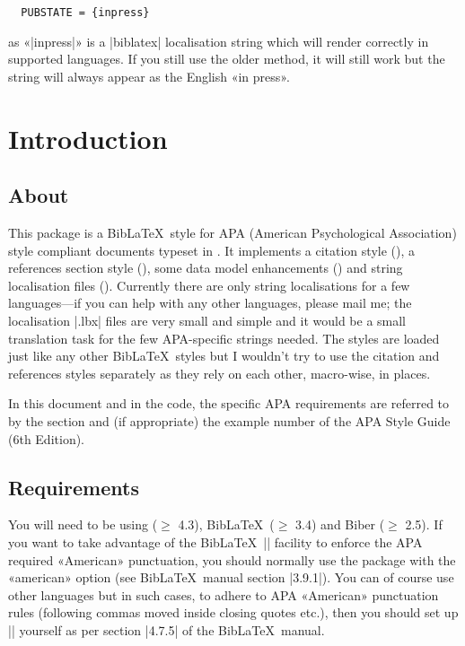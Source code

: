 \documentclass{ltxdockit}
\begin{document}
\begin{verbatim}
  PUBSTATE = {inpress}
\end{verbatim}

\noindent as «|inpress|» is a |biblatex| localisation string which will
render correctly in supported languages. If you still use the older method,
it will still work but the string will always appear as the English «in
press».

\section{Introduction}\label{int}

\subsection{About}

This package is a Bib\LaTeX\ style for APA (American Psychological
Association) style compliant documents typeset in \latex. It implements a
citation style (), a references section style
(), some data model enhancements () and string
localisation files (). Currently there are only
string localisations for a few languages---if you can help with any other
languages, please mail me; the localisation |.lbx| files are very small and
simple and it would be a small translation task for the few APA-specific
strings needed. The styles are loaded just like any other Bib\LaTeX\ styles
but I wouldn't try to use the citation and references styles separately as
they rely on each other, macro-wise, in places.

In this document and in the code, the specific APA requirements are
referred to by the section and (if appropriate) the example number of the
APA Style Guide (6th Edition).

\subsection{Requirements}\label{ref:req}

You will need to be using  ($\geq$ 4.3), Bib\LaTeX\ ($\geq$
3.4) and Biber ($\geq$ 2.5). If you want to take advantage of the
Bib\LaTeX\ |\DeclareQuotePunctuation| facility to enforce the APA required
«American» punctuation, you should normally use the  package
with the «american» option (see Bib\LaTeX\ manual section |3.9.1|). You can
of course use other languages but in such cases, to adhere to APA
«American» punctuation rules (following commas moved inside closing quotes
etc.), then you should set up |\DeclareQuotePunctuation| yourself as per
section |4.7.5| of the Bib\LaTeX\ manual.
\end{document}
